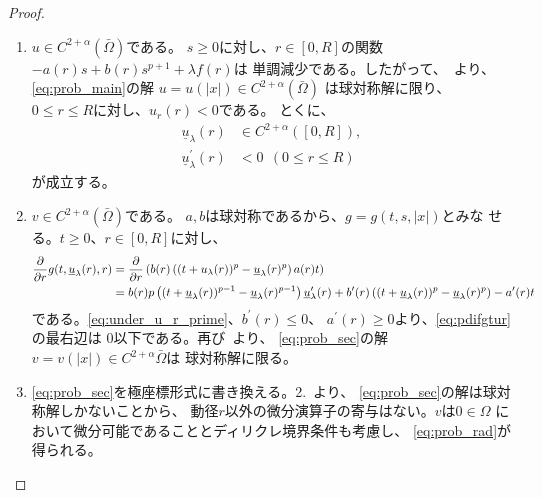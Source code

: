 \begin{proof}
 \begin{enumerate}[1.] \sage
  \item $u \in C^{2+\alpha}(\bar{\Omega})$である。
        $s \geq 0$に対し、$r \in [0, R]$の関数
        $-a(r) s + b(r) s^{p+1} + \lambda f(r)$は
        単調減少である。したがって、\cite{MR544879}~より、
        \ref{eq:prob_main}の解
        $u = u(\lvert x \rvert) \in C^{2+\alpha}(\bar{\Omega})$
        は球対称解に限り、
        $0 \leq r \leq R$に対し、$u_r (r) < 0$である。
        とくに、
        \begin{align}
         \underline{u}_\lambda(r) & \in C^{2+ \alpha}([0, R]), 
          \label{eq:under_u_r} \\
         \underline{u}_\lambda^\prime(r) &< 0 \ \ (0 \leq r \leq R)
          \label{eq:under_u_r_prime}
        \end{align}
        が成立する。
  \item $v \in C^{2+\alpha}(\bar{\Omega})$である。
        $a, b$は球対称であるから、$g = g(t, s, \lvert x \rvert)$とみな
        せる。$t \geq 0$、$r \in [0, R]$に対し、
        \begin{align}
         \frac{\partial }{\partial r} g(t, \underline{u}_\lambda(r), r)
         &= \frac{\partial }{\partial r} \left( b(r) \left( (t + u_\lambda(r))^p -
         \underline{u}_\lambda(r)^p \right) a(r) t \right) \notag \\
         &= b(r) p \left( (t+ \underline{u}_\lambda(r))^{p-1} -
         \underline{u}_\lambda(r)^{p-1} \right)
         \underline{u}_\lambda^\prime(r) + b^\prime(r) \left( (t +
         \underline{u}_\lambda(r))^p  - \underline{u}_\lambda(r)^p
         \right) - a^\prime(r) t \label{eq:pdifgtur}
        \end{align}
        である。\eqref{eq:under_u_r_prime}、$b^\prime(r) \leq 0$、
        $a^\prime(r) \geq 0$より、\eqref{eq:pdifgtur}の最右辺は
        $0$以下である。再び\cite{MR544879}~より、
        \ref{eq:prob_sec}の解
        $v = v(\lvert x \rvert) \in C^{2+\alpha}\bar{\Omega}$は
        球対称解に限る。
  \item \ref{eq:prob_sec}を極座標形式に書き換える。2.~より、
        \ref{eq:prob_sec}の解は球対称解しかないことから、
        動径$r$以外の微分演算子の寄与はない。$v$は$0 \in \Omega$
        において微分可能であることとディリクレ境界条件も考慮し、
        \eqref{eq:prob_rad}が得られる。\qedhere
 \end{enumerate}
\end{proof}

